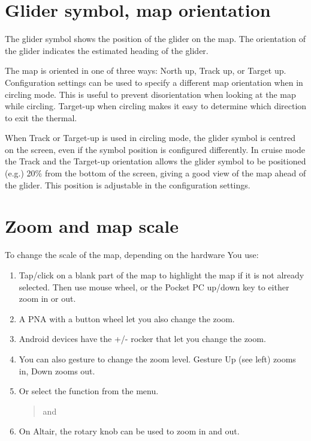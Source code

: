 \section{Glider symbol, map orientation}
The glider symbol shows the position of the glider on the map.  The
orientation of the glider indicates the estimated heading of the
glider.

The map is oriented in one of three ways: North up,
Track up, or Target up.  Configuration settings  can be used
to specify a different map orientation when in circling mode. This is useful to prevent
disorientation when looking at the map while circling.  Target-up when
circling makes it easy to determine which direction to exit the
thermal.

When Track or Target-up is used in circling mode, the glider symbol is
centred on the screen, even if the symbol position is configured differently.
In cruise mode the Track and the Target-up orientation allows the glider
symbol to be positioned (e.g.) 20\% from the bottom of the screen, giving a good view of the
map ahead of the glider.  This position is adjustable in the configuration
 settings.

\section{Zoom and map scale}\label{sec:zooming}

To change the scale of the map, depending on the hardware You use:
\begin{enumerate}
\item Tap/click on a blank part of the map to highlight the map if it is not
already selected.
Then use mouse wheel, or the Pocket PC up/down key to either zoom
in or out.
\item A PNA with a button wheel let you also change the zoom. 
\item Android devices have the +/- rocker that let you change the zoom. 
\item You can also gesture to change the zoom level. Gesture 
Up (see left) zooms in, Down zooms out.
\item Or select the function from the menu.
\begin{quote}
\blink{} and 
\end{quote}
\item On Altair, the rotary knob can be used to zoom in and out.
\end{enumerate}

